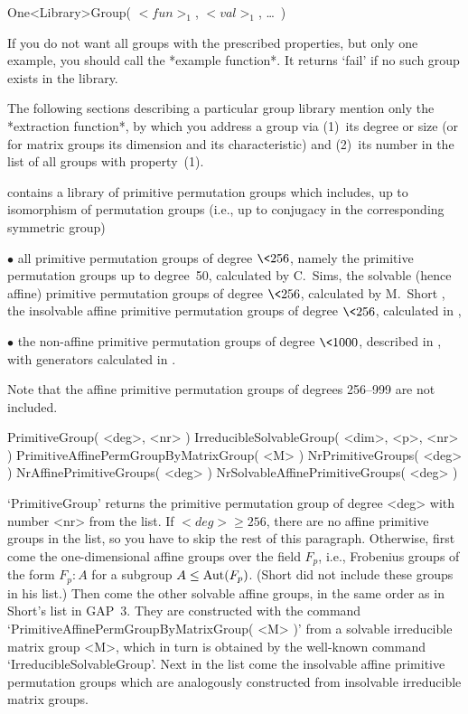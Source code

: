 \)\fmark One<Library>Group( $<fun>_1$, $<val>_1$, \dots\ )

If you  do not want  all groups with the  prescribed properties, but only
one example, you should call the *example function*. It returns `fail' if
no such group exists in the library.

The following sections describing a particular group library mention only
the *extraction   function*, by which  you  address a group   via (1)~its
degree  or   size    (or for  matrix   groups  its    dimension  and  its
characteristic) and  (2)~its  number  in  the list  of all   groups  with
property~(1).


{\GAP} contains a library of primitive permutation groups which includes,
up to  isomorphism of permutation groups   (i.e., up to conjugacy  in the
corresponding symmetric group)
{\parindent\manindent
\item{$\bullet$} all   primitive permutation  groups  of  degree $\<256$,
  namely
\itemitem{$\circ$}  the  primitive permutation  groups   up to degree~50,
  calculated by C.~Sims,
\itemitem{$\circ$}  the  solvable (hence  affine)   primitive permutation
  groups of degree $\<256$, calculated by M.~Short \cite{Short92},
\itemitem{$\circ$} the insolvable affine  primitive permutation groups of
  degree $\<256$, calculated in \cite{Theissen97},
\item{$\bullet$} the non-affine primitive   permutation groups of  degree
  $\<1000$,  described   in   \cite{DixonMortimer88},  with    generators
  calculated in \cite{Theissen97}.\par}
Note that the affine primitive permutation groups of degrees 256--999 are
not included.

\>PrimitiveGroup( <deg>, <nr> )
\>IrreducibleSolvableGroup( <dim>, <p>, <nr> )
\>PrimitiveAffinePermGroupByMatrixGroup( <M> )
\>NrPrimitiveGroups( <deg> )
\>NrAffinePrimitiveGroups( <deg> )
\>NrSolvableAffinePrimitiveGroups( <deg> )

`PrimitiveGroup' returns the primitive permutation  group of degree <deg>
with number <nr>  from the list. If  $<deg>\ge 256$, there  are no affine
primitive  groups in  the list, so   you have to  skip  the rest  of this
paragraph. Otherwise, first  come the one-dimensional affine  groups over
the field $F_p$, i.e., Frobenius groups of the  form $ F_p\mathbin:A$ for
a  subgroup $A\le{\rm Aut}(F_p)$. (Short did  not include these groups in
his list.) Then come the other solvable  affine groups, in the same order
as in Short's list in {\sf GAP~3}. They  are constructed with the command
`PrimitiveAffinePermGroupByMatrixGroup(      <M>  )'   from   a  solvable
irreducible matrix group <M>, which in turn is obtained by the well-known
command `IrreducibleSolvableGroup'. Next  in the list come the insolvable
affine primitive  permutation groups   which are  analogously constructed
from insolvable irreducible matrix groups.

